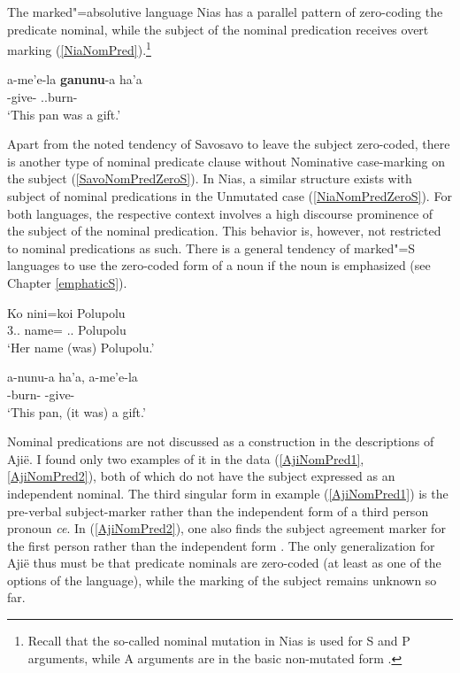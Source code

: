 The marked"=absolutive language Nias has a parallel pattern of zero-coding the predicate nominal, while the subject of the nominal predication receives overt marking (\ref{NiaNomPred}).\footnote{Recall that the so-called nominal mutation in Nias is used for S and P arguments, while A arguments are in the basic non-mutated form \citep{Brown:2001}.}  

\begin{exe}
\ex\label{NiaNomPred}
\gll a-me'e-la \textbf{ganunu}-a ha'a\\
\ipfv{}-give-\NR{} \ipfv{}.\mut{}.burn-\nmlz{} \prox{}\\
\glt `This pan was a gift.'
\end{exe}

Apart from the noted tendency of Savosavo to leave the subject zero-coded, there is another type of nominal predicate clause without Nominative case-mark\-ing on the subject (\ref{SavoNomPredZeroS}). 
In Nias, a similar structure exists with subject of nominal predications in the Unmutated case (\ref{NiaNomPredZeroS}). 
For both languages, the respective context involves a high discourse prominence of the subject of the nominal predication.  
This behavior is, however, not restricted to nominal predications as such. 
There is a general tendency of marked"=S languages to use the zero-coded form of a noun if the noun is emphasized (see Chapter \ref{emphaticS}).

\begin{exe}\ex\label{SavoNomPredZeroS}
\gll Ko nini=koi Polupolu\\
3\sg{}.\fem{}.\gen{} name=\emphat{} \deter{}.\sg{}.\fem{} Polupolu\\
\glt `Her name (was) Polupolu.'
\end{exe}


\begin{exe}
\ex\label{NiaNomPredZeroS}
\gll a-nunu-a ha'a, a-me'e-la\\
\ipfv{}-burn-\nmlz{} \prox{} \ipfv{}-give-\nmlz{}\\
\glt `This pan, (it was) a gift.'
\end{exe}

Nominal predications are not discussed as a construction in the descriptions of Aji\"e. 
I found only two examples of it in the data (\ref{AjiNomPred1}, \ref{AjiNomPred2}), both of which do not have the subject expressed as an independent nominal.
The third singular form in example (\ref{AjiNomPred1}) is the pre-verbal subject-marker rather than the independent form of a third person pronoun \emph{ce}. 
In (\ref{AjiNomPred2}), one also finds the subject agreement marker for the first person rather than the independent form \emph{}.
The only generalization for Aji\"e thus must be that predicate nominals are zero-coded (at least as one of the options of the language), while the marking of the subject remains unknown so far.  


